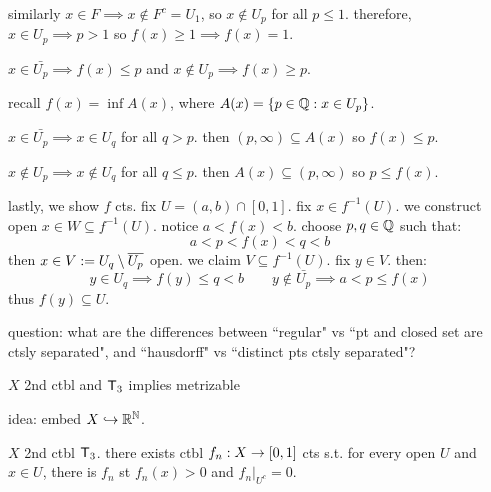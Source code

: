 \begin{pf}[source=Primary Source Material]
\begin{block}
        similarly $x\in F\implies x\notin F^{c}=U_{1}$, so
        $x\notin U_{p}$ for all $p\leq1$.
        therefore, $x\in U_{p}\implies p>1$ so $f(x)\geq1\implies f(x)=1$.
    \end{block}
    $x\in\bar{U_{p}}\implies f(x)\leq p$ and
    $x\notin U_{p}\implies f(x)\geq p$.
    \begin{block}
        recall $f(x)=\inf A(x)$, where $A(x)=\left\{{p\in\mathbb{Q}:x\in U_{p}}\right\}$.

        $x\in\bar{U_{p}}\implies x\in U_{q}$ for all $q>p$.
        then $(p,\infty)\subseteq A(x)$ so $f(x)\leq p$.

        $x\notin U_{p}\implies x\notin U_{q}$ for all $q\leq p$.
        then $A(x)\subseteq(p,\infty)$ so $p\leq f(x)$.
    \end{block}
    lastly, we show $f$ cts. fix $U=(a,b)\cap[0,1]$.
    fix $x\in f^{-1}(U)$. we construct open $x\in W\subseteq f^{-1}(U)$.
    notice $a<f(x)<b$. choose $p,q\in\mathbb{Q}$ such that:
    \begin{equation*}
        a<p<f(x)<q<b
    \end{equation*}
    then $x\in V:=U_{q}\setminus\overline{U_{p}}$ open. we claim $V\subseteq f^{-1}(U)$.
    fix $y\in V$. then:
    \begin{equation*}
        y\in U_{q}\implies f(y)\leq q<b \qquad
        y\notin\bar{U_{p}}\implies a<p\leq f(x)
    \end{equation*}
    thus $f(y)\subseteq U$.
\end{pf}
question: what are the differences between ``regular" vs ``pt and closed set are
ctsly separated", and ``hausdorff" vs ``distinct pts ctsly separated"?

\begin{thm}[title=Urysohn's Metrization Theorem]
    $X$ 2nd ctbl and $\mathsf{T}_{3}$ implies metrizable
\end{thm}
\vspace{-2.5mm}
idea: embed $X\hookrightarrow\mathbb{R}^{\mathbb{N}}$.
\vspace{2.5mm}

\begin{lm}
    $X$ 2nd ctbl $\mathsf{T}_{3}$.
    there exists ctbl $f_{n}:X\rightarrow[0,1]$ cts s.t. for every open $U$ and
    $x\in U$, there is $f_{n}$ st $f_{n}(x)>0$ and $f_{n}\rvert_{U^{c}}=0$.
\end{lm}


